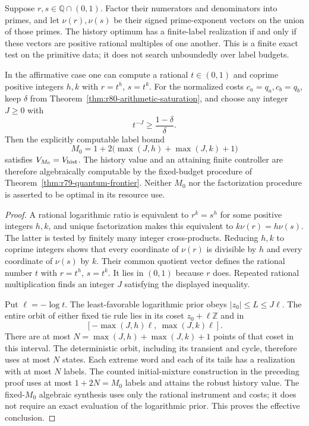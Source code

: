 \begin{corollary}
\label{cor:r80-effective-saturation}
Suppose $r,s\in\mathbb Q\cap(0,1)$.  Factor their numerators and
denominators into primes, and let $\nu(r),\nu(s)$ be their signed
prime-exponent vectors on the union of those primes.  The history
optimum has a finite-label realization if and only if these vectors
are positive rational multiples of one another.  This is a finite
exact test on the primitive data; it does not search unboundedly
over label budgets.

In the affirmative case one can compute a rational $t\in(0,1)$
and coprime positive integers $h,k$ with $r=t^h$, $s=t^k$.
For the normalized costs $c_a=q_a,c_b=q_b$, keep $\delta$ from Theorem~\ref{thm:r80-arithmetic-saturation},
and choose any integer $J\ge0$ with
\[
 t^{-J}\ge\frac{1-\delta}{\delta}.
\]
Then the explicitly computable label bound
\begin{equation}\label{eq:r80-rational-label-cap}
 M_0=1+2\bigl(\max(J,h)+\max(J,k)+1\bigr)
\end{equation}
satisfies $V_{M_0}=V_{\rm hist}$.  The history value and an
attaining finite controller are therefore algebraically computable
by the fixed-budget procedure of
Theorem~\ref{thm:r79-quantum-frontier}.  Neither $M_0$ nor the
factorization procedure is asserted to be optimal in its resource
use.
\end{corollary}
\begin{proof}
A rational logarithmic ratio is equivalent to $r^k=s^h$ for some
positive integers $h,k$, and unique factorization makes this
equivalent to $k\nu(r)=h\nu(s)$.  The latter is tested by finitely
many integer cross-products.  Reducing $h,k$ to coprime integers
shows that every coordinate of $\nu(r)$ is divisible by $h$ and
every coordinate of $\nu(s)$ by $k$.  Their common quotient
vector defines the rational number $t$ with $r=t^h$, $s=t^k$.
It lies in $(0,1)$ because $r$ does.  Repeated rational multiplication
finds an integer $J$ satisfying the displayed inequality.

Put $\ell=-\log t$.  The least-favorable logarithmic prior obeys
$|z_0|\le L\le J\ell$.  The entire orbit of either fixed tie rule
lies in its coset $z_0+\ell\mathbb Z$ and in
\[
 [-\max(J,h)\ell,\ \max(J,k)\ell].
\]
There are at most $N=\max(J,h)+\max(J,k)+1$ points of that
coset in this interval.  The deterministic orbit, including its
transient and cycle, therefore uses at most $N$ states.  Each
extreme word and each of its tails has a realization with at
most $N$ labels.  The counted initial-mixture construction in
the preceding proof uses at most $1+2N=M_0$ labels and attains
the robust history value.  The fixed-$M_0$ algebraic synthesis
uses only the rational instrument and costs; it does not require
an exact evaluation of the logarithmic prior.  This proves the
effective conclusion.
\end{proof}

